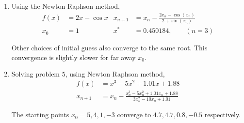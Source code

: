 \begin{enumerate}
    \item Using the Newton Raphson method,
          \begin{align}
              f(x)    & = 2x - \cos x                                  &
              x_{n+1} & = x_n - \frac{2x_n - \cos(x_n)}{2 + \sin(x_n)}   \\
              x_0     & = 1                                            &
              x^*     & = 0.450184,\qquad (n=3)
          \end{align}
          \begin{figure}[H]
              \centering
          \end{figure}

          Other choices of initial guess also converge to the same root. This convergence
          is slightly slower for far away $ x_0 $.

    \item Solving problem $ 5 $, using Newton Raphson method,
          \begin{align}
              f(x)    & = x^3 - 5x^2 + 1.01x + 1.88                    \\
              x_{n+1} & = x_n - \frac{x_n^3 - 5x_n^2 + 1.01x_n + 1.88}
              {3x_n^2 - 10x_n + 1.01}
          \end{align}
          \begin{figure}[H]
              \centering
          \end{figure}
          The starting points $ x_0 = 5,4,1,-3 $ converge to $ 4.7, 4.7, 0.8, -0.5 $
          respectively. \par


\end{enumerate}
